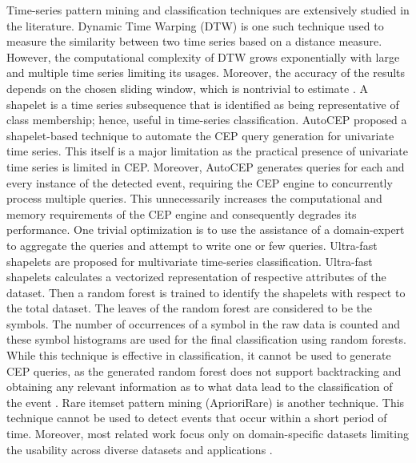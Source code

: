 \documentclass[conference]{IEEEtran}  %
\begin{document}
Time-series pattern mining and classification techniques are extensively studied in the literature. Dynamic Time Warping (DTW) \cite{IEEEexample:DTW} is one such technique used to measure the similarity between two time series based on a distance measure. However, the computational complexity of DTW grows exponentially with large and multiple time series limiting its usages. Moreover, the accuracy of the results depends on the chosen sliding window, which is nontrivial to estimate \cite{IEEEexample:autoCEP}. A shapelet \cite{IEEEexample:TimeSeriesShapelets} is a time series subsequence that is identified as being representative of class membership; hence, useful in time-series classification. AutoCEP \cite{IEEEexample:autoCEP} proposed a shapelet-based technique to automate the CEP query generation for univariate time series. This itself is a major limitation as the practical presence of univariate time series is limited in CEP. Moreover, AutoCEP generates queries for each and every instance of the detected event, requiring the CEP engine to concurrently process multiple queries. This unnecessarily increases the computational and memory requirements of the CEP engine and consequently degrades its performance. One trivial optimization is to use the assistance of a domain-expert to aggregate the queries and attempt to write one or few queries. Ultra-fast shapelets \cite{IEEEexample:UltraFast} are proposed for multivariate time-series classification. Ultra-fast shapelets calculates a vectorized representation of respective attributes of the dataset. Then a random forest is trained to identify the shapelets with respect to the total dataset. The leaves of the random forest are considered to be the symbols. The number of occurrences of a symbol in the raw data is counted and these symbol histograms are used for the final classification using random forests. While this technique is effective in classification, it cannot be used to generate CEP queries, as the generated random forest does not support backtracking and obtaining any relevant information as to what data lead to the classification of the event \cite{IEEEexample:UltraFast}. Rare itemset pattern mining (AprioriRare) \cite{IEEEexample:RareItemSet} is another technique. This technique cannot be used to detect events that occur within a short period of time. Moreover, most related work focus only on domain-specific datasets limiting the usability across diverse datasets and applications \cite{IEEEexample:UserOriented,IEEEexample:WebBased}.
\end{document}
